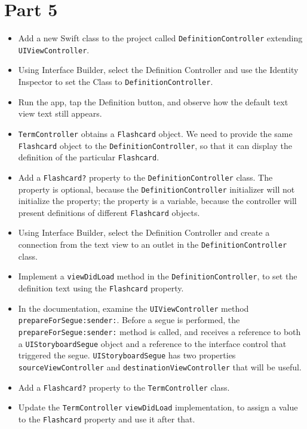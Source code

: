 \documentclass[a4paper,11pt]{scrartcl}
\begin{document}
\section*{Part 5}

\begin{itemize}
\item Add a new Swift class to the project called \texttt{DefinitionController} extending \texttt{UIViewController}.
\item Using Interface Builder, select the Definition Controller and use the Identity Inspector to set the Class to \texttt{DefinitionController}.
\item Run the app, tap the Definition button, and observe how the default text view text still appears.
\item \texttt{TermController} obtains a \texttt{Flashcard} object. We need to provide the same \texttt{Flashcard} object to the \texttt{DefinitionController}, so that it can display the definition of the particular \texttt{Flashcard}.
\item Add a \texttt{Flashcard?} property to the \texttt{DefinitionController} class. The property is optional, because the \texttt{DefinitionController} initializer will not initialize the property; the property is a variable, because the controller will present definitions of different \texttt{Flashcard} objects.
\item Using Interface Builder, select the Definition Controller and create a connection from the text view to an outlet in the \texttt{DefinitionController} class.
\item Implement a \texttt{viewDidLoad} method in the \texttt{DefinitionController}, to set the definition text using the \texttt{Flashcard} property.
\item In the documentation, examine the \texttt{UIViewController} method \texttt{prepareForSegue:sender:}. Before a segue is performed, the \texttt{prepareForSegue:sender:} method is called, and receives a reference to both a \texttt{UIStoryboardSegue} object and a reference to the interface control that triggered the segue. \texttt{UIStoryboardSegue} has two properties \texttt{sourceViewController} and \texttt{destinationViewController} that will be useful.
\item Add a \texttt{Flashcard?} property to the \texttt{TermController} class.
\item Update the \texttt{TermController} \texttt{viewDidLoad} implementation, to assign a value to the \texttt{Flashcard} property and use it after that.

\end{itemize}
\end{document}
